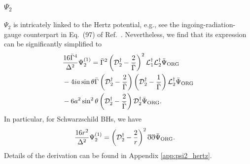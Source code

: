 \documentclass[aps,prd,amsmath,floats,floatfix, twocolumn,
superscriptaddress,nofootinbib,showpacs]{revtex4-1}
\newcommand{\hertzbar}{\bar{\Psi}_{\rm ORG}}
\begin{document}
\subsubsection{\texorpdfstring{$\Psi_2$}{Psi2}}
$\Psi_2$ is intricately linked to the Hertz potential, e.g., see the ingoing-radiation-gauge counterpart in Eq.~(97) of Ref.~\cite{Keidl:2006wk}. Nevertheless, we find that its expression can be significantly simplified to
\begin{align}
&\frac{16\bar{\Gamma}^4}{\Delta^2}\Psi_2^{(1)}= \bar{\Gamma}^2\left(\mathcal{D}^\dagger_2-\frac{2}{\bar{\Gamma}}\right)^2 \mathcal{L}_1^\dagger\mathcal{L}_2^\dagger\hertzbar \notag \\
&-4ia\sin\theta \bar{\Gamma} \left(\mathcal{D}^\dagger_2-\frac{2}{\bar{\Gamma}}\right) \left(\mathcal{D}^\dagger_2-\frac{1}{\bar{\Gamma}}\right) \mathcal{L}_2^\dagger\hertzbar \notag \\
&-6a^2\sin^2\theta \left(\mathcal{D}^\dagger_2-\frac{2}{\bar{\Gamma}}\right)\mathcal{D}^\dagger_2\hertzbar. \label{eq:psi2_hertz_final}
\end{align}
In particular, for Schwarzschild BHs, we have
\begin{align}
&\frac{16r^2}{\Delta^2}\Psi_2^{(1)}=\left(\mathcal{D}^\dagger_2-\frac{2}{r}\right)^2 \eth\eth\hertzbar.
\end{align}
Details of the derivation can be found in Appendix \ref{app:psi2_hertz}.

\end{document}
